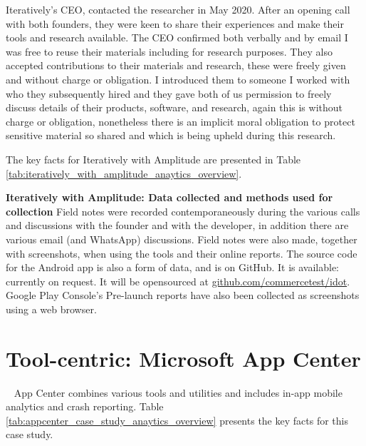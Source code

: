 Iteratively's CEO, contacted the researcher in May 2020. After an opening call with both founders, they were keen to share their experiences and make their tools and research available. The CEO confirmed both verbally and by email I was free to reuse their materials including for research purposes. They also accepted contributions to their materials and research, these were freely given and without charge or obligation. I introduced them to someone I worked with who they subsequently hired and they gave both of us permission to freely discuss details of their products, software, and research, again this is without charge or obligation, nonetheless there is an implicit moral obligation to protect sensitive material so shared and which is being upheld during this research.

The key facts for Iteratively with Amplitude are presented in Table \ref{tab:iteratively_with_amplitude_anaytics_overview}.

\textbf{Iteratively with Amplitude: Data collected and methods used for collection}
Field notes were recorded contemporaneously during the various calls and discussions with the founder and with the developer, in addition there are various email (and WhatsApp) discussions. Field notes were also made, together with screenshots, when using the tools and their online reports. The source code for the Android app is also a form of data, and is on GitHub. It is available: currently on request. It will be opensourced at \href{https://github.com/commercetest/idot}{github.com/commercetest/idot}. Google Play Console's Pre-launch reports have also been collected as screenshots using a web browser.





\section{Tool-centric: Microsoft App Center}~\label{case-study-overview-microsoft-app-center}
App Center combines various tools and utilities and includes in-app mobile analytics and crash reporting. Table \ref{tab:appcenter_case_study_anaytics_overview} presents the key facts for this case study.

